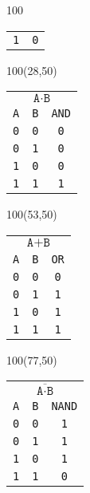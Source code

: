 \documentclass[aspectratio=169]{beamer}
\begin{document}
\begin{frame}[fragile,t]
\begin{textblock}{100}
\begin{tabular}{c|c}
    \texttt{1} & \texttt{0} \\
    \end{tabular}
    \end{textblock}
    \begin{textblock}{100}(28,50)
    \begin{tabular}{cc|c}
    \multicolumn{3}{c}{\textcolor{naranjauca}{ $\texttt{A}\cdot\texttt{B}$ } } \\
    \texttt{A} & \texttt{B} & \texttt{AND} \\
    \hline
    \texttt{0} & \texttt{0} & \texttt{0} \\
    \texttt{0} & \texttt{1} & \texttt{0} \\
    \texttt{1} & \texttt{0} & \texttt{0} \\
    \texttt{1} & \texttt{1} & \texttt{1} \\
    \end{tabular}
    \end{textblock}
    \begin{textblock}{100}(53,50)
    \begin{tabular}{cc|c}
    \multicolumn{3}{c}{\textcolor{naranjauca}{ $\texttt{A}+\texttt{B}$ } } \\
    \texttt{A} & \texttt{B} & \texttt{OR} \\
    \hline
    \texttt{0} & \texttt{0} & \texttt{0} \\
    \texttt{0} & \texttt{1} & \texttt{1} \\
    \texttt{1} & \texttt{0} & \texttt{1} \\
    \texttt{1} & \texttt{1} & \texttt{1} \\
    \end{tabular}
    \end{textblock}
    \begin{textblock}{100}(77,50)
    \begin{tabular}{cc|c}
    \multicolumn{3}{c}{\textcolor{naranjauca}{ $\overline{\texttt{A}\cdot\texttt{B}}$ } } \\
    \texttt{A} & \texttt{B} & \texttt{NAND} \\
    \hline
    \texttt{0} & \texttt{0} & \texttt{1} \\
    \texttt{0} & \texttt{1} & \texttt{1} \\
    \texttt{1} & \texttt{0} & \texttt{1} \\
    \texttt{1} & \texttt{1} & \texttt{0} \\
    \end{tabular}
    \end{textblock}

\end{frame}
\end{document}
